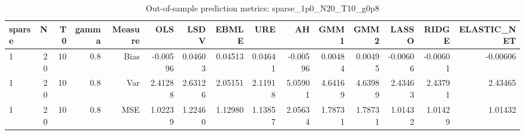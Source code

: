 \begin{table}[!htbp]\centering
\caption{Out-of-sample prediction metrics: sparse_1p0_N20_T10_g0p8}
\label{tab:table3_sparse_1p0_N20_T10_g0p8}
\begin{tabular}{lrrrrrrrrrrrrrr}
\hline
sparse & N & T0 & gamma & Measure & OLS & LSDV & EBMLE & URE & AH & GMM1 & GMM2 & LASSO & RIDGE & ELASTIC_NET \\
\hline
1 & 20 & 10 & 0.8 & Bias & -0.00596 & 0.04603 & 0.04513 & 0.04641 & -0.00596 & 0.00484 & 0.00495 & -0.00606 & -0.00601 & -0.00606 \\
1 & 20 & 10 & 0.8 & Var & 2.41288 & 2.63126 & 2.05151 & 2.11918 & 5.05901 & 4.64169 & 4.63989 & 2.43463 & 2.43791 & 2.43465 \\
1 & 20 & 10 & 0.8 & MSE & 1.02239 & 1.22460 & 1.12980 & 1.13857 & 2.05634 & 1.78731 & 1.78731 & 1.01432 & 1.01429 & 1.01432 \\
\hline
\end{tabular}
\end{table}

